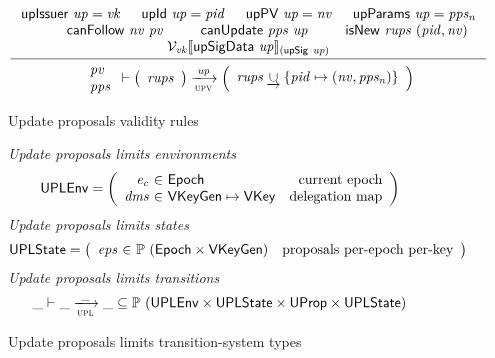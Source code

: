 \begin{figure}[htb]
  \begin{equation}
    \label{eq:rule:up-validity}
    \inference
    {
      \upIssuer{up} = \var{vk}
      & \upId{up} = \var{pid}
      & \upPV{up} = \var{nv}
      & \upParams{up} = \var{pps_n}\\
      & \fun{canFollow}~\var{nv}~\var{pv}
      & \fun{canUpdate}~\var{pps}~\var{up}
      & \fun{isNew}~\var{rups}~(\var{pid}, \var{nv})\\
      \mathcal{V}_{\var{vk}}\serialised{\upSigData{up}}_{(\upSig{up})}
    }
    {
      {
        \begin{array}{l}
          \var{pv}\\
          \var{pps}
        \end{array}
      }
      \vdash
      {
        \left(
          \begin{array}{l}
            \var{rups}
          \end{array}
        \right)
      }
      \trans{upv}{\var{up}}
      {
        \left(
          \begin{array}{l}
            \var{rups} \unionoverride \{ \var{pid} \mapsto (\var{nv}, \var{pps_n}) \}
          \end{array}
        \right)
      }
    }
  \end{equation}
  \caption{Update proposals validity rules}
  \label{fig:rules:up-validity}
\end{figure}

\clearpage

\begin{figure}[htb]
  \emph{Update proposals limits  environments}
    \begin{equation*}
    \UPLEnv =
    \left(
      \begin{array}{r@{~\in~}lr}
        \var{e_c} & \Epoch & \text{current epoch}\\
        \var{dms} & \VKeyGen \mapsto \VKey & \text{delegation map}\\
      \end{array}
    \right)
  \end{equation*}
  \emph{Update proposals limits states}
  \begin{equation*}
    \UPLState
    = \left(
      \begin{array}{r@{~\in~}lr}
        \var{eps} & \powerset{(\Epoch \times \VKeyGen)} & \text{proposals per-epoch per-key}\\
      \end{array}
    \right)
  \end{equation*}
  \emph{Update proposals limits transitions}
  \begin{equation*}
    \var{\_} \vdash
    \var{\_} \trans{upl}{\_} \var{\_}
    \subseteq \powerset (\UPLEnv \times \UPLState \times \UProp \times \UPLState)
  \end{equation*}
  \caption{Update proposals limits transition-system types}
  \label{fig:ts-types:up-limits}
\end{figure}

